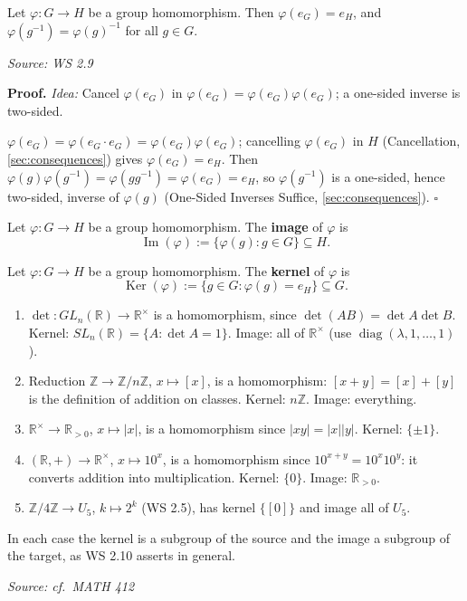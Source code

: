 \documentclass[11pt]{report}
\renewenvironment{proof}[1][Proof]{\noindent\textbf{#1.} }{\hfill$\square$\par\vspace{5pt}}
\newcommand{\srcline}[1]{\par\hfill{\footnotesize\textit{Source: #1}}}
\begin{document}
\begin{propbox}\label{prop:homomorphisms-preserve-identity-inverses}
Let $\varphi: G \to H$ be a group homomorphism. Then $\varphi(e_G) = e_H$, and $\varphi(g^{-1}) = \varphi(g)^{-1}$ for all $g \in G$.
\srcline{WS 2.9}
\end{propbox}

\begin{proof}
\textit{Idea:} Cancel $\varphi(e_G)$ in $\varphi(e_G) = \varphi(e_G)\varphi(e_G)$; a one-sided inverse is two-sided.\par
$\varphi(e_G) = \varphi(e_G \cdot e_G) = \varphi(e_G)\varphi(e_G)$; cancelling $\varphi(e_G)$ in $H$ (Cancellation, \ref{sec:consequences}) gives $\varphi(e_G) = e_H$. Then $\varphi(g)\varphi(g^{-1}) = \varphi(g g^{-1}) = \varphi(e_G) = e_H$, so $\varphi(g^{-1})$ is a one-sided, hence two-sided, inverse of $\varphi(g)$ (One-Sided Inverses Suffice, \ref{sec:consequences}).
\end{proof}

\begin{defbox}[Image]\label{def:image-kernel}
Let $\varphi: G \to H$ be a group homomorphism. The \textbf{image} of $\varphi$ is
\[ \operatorname{Im}(\varphi) := \{ \varphi(g) : g \in G \} \subseteq H. \]
\end{defbox}

\begin{defbox}[Kernel]\label{def:kernel}
Let $\varphi: G \to H$ be a group homomorphism. The \textbf{kernel} of $\varphi$ is
\[ \operatorname{Ker}(\varphi) := \{ g \in G : \varphi(g) = e_H \} \subseteq G. \]
\end{defbox}

\begin{exbox}\label{ex:homomorphisms-their-kernels}
\begin{enumerate}
    \item $\det: GL_n(\mathbb{R}) \to \mathbb{R}^\times$ is a homomorphism, since $\det(AB) = \det A \det B$. Kernel: $SL_n(\mathbb{R}) = \{A : \det A = 1\}$. Image: all of $\mathbb{R}^\times$ (use $\operatorname{diag}(\lambda, 1, \ldots, 1)$).
    \item Reduction $\mathbb{Z} \to \mathbb{Z}/n\mathbb{Z}$, $x \mapsto [x]$, is a homomorphism: $[x + y] = [x] + [y]$ is the definition of addition on classes. Kernel: $n\mathbb{Z}$. Image: everything.
    \item $\mathbb{R}^\times \to \mathbb{R}_{>0}$, $x \mapsto |x|$, is a homomorphism since $|xy| = |x||y|$. Kernel: $\{\pm 1\}$.
    \item $(\mathbb{R}, +) \to \mathbb{R}^\times$, $x \mapsto 10^x$, is a homomorphism since $10^{x+y} = 10^x 10^y$: it converts addition into multiplication. Kernel: $\{0\}$. Image: $\mathbb{R}_{>0}$.
    \item $\mathbb{Z}/4\mathbb{Z} \to U_5$, $k \mapsto 2^k$ (WS 2.5), has kernel $\{[0]\}$ and image all of $U_5$.
\end{enumerate}
In each case the kernel is a subgroup of the source and the image a subgroup of the target, as WS 2.10 asserts in general.
\srcline{cf.\ MATH 412}
\end{exbox}
\end{document}
